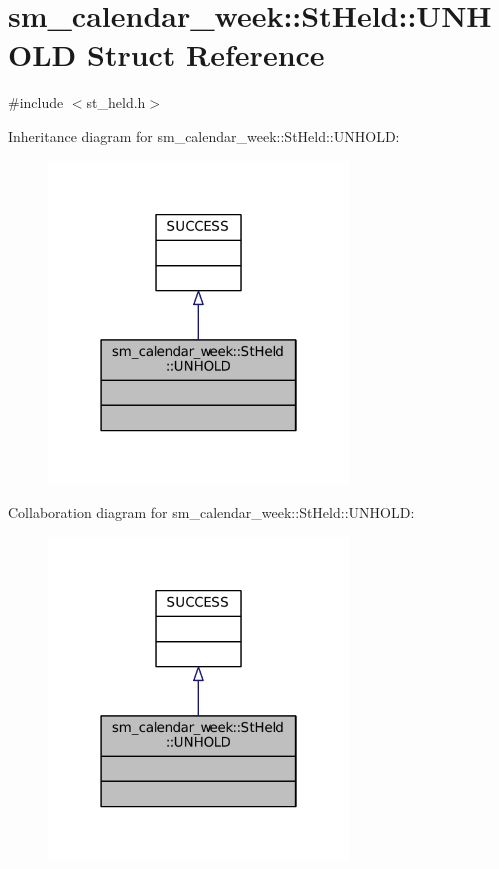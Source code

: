 \hypertarget{structsm__calendar__week_1_1StHeld_1_1UNHOLD}{}\section{sm\+\_\+calendar\+\_\+week\+:\+:St\+Held\+:\+:U\+N\+H\+O\+LD Struct Reference}
\label{structsm__calendar__week_1_1StHeld_1_1UNHOLD}


{\ttfamily \#include $<$st\+\_\+held.\+h$>$}



Inheritance diagram for sm\+\_\+calendar\+\_\+week\+:\+:St\+Held\+:\+:U\+N\+H\+O\+LD\+:
\nopagebreak
\begin{figure}[H]
\begin{center}
\leavevmode
\includegraphics[width=226pt]{structsm__calendar__week_1_1StHeld_1_1UNHOLD__inherit__graph}
\end{center}
\end{figure}


Collaboration diagram for sm\+\_\+calendar\+\_\+week\+:\+:St\+Held\+:\+:U\+N\+H\+O\+LD\+:
\nopagebreak
\begin{figure}[H]
\begin{center}
\leavevmode
\includegraphics[width=226pt]{structsm__calendar__week_1_1StHeld_1_1UNHOLD__coll__graph}
\end{center}
\end{figure}


